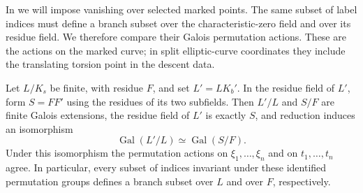 In  we will impose vanishing over selected marked
points. The same subset of label indices must define a branch subset over
the characteristic-zero field and over its residue field. We therefore
compare their Galois permutation actions. These are the actions on the
marked curve; in split elliptic-curve coordinates they include the
translating torsion point in the descent data.

\begin{lemma}\label{lem:residue-permutations}
Let $L/K_s$ be finite, with residue $F$, and set
$L'=LK_b'$.  In the residue field of $L'$, form $S=FF'$ using the
residues of its two subfields.  Then $L'/L$ and $S/F$ are finite Galois
extensions, the residue field of $L'$ is exactly $S$, and reduction
induces an isomorphism
\[
             \operatorname{Gal}(L'/L)\simeq\operatorname{Gal}(S/F).
\]
Under this isomorphism the permutation actions on $\xi_1,\ldots,\xi_n$
and on $t_1,\ldots,t_n$ agree. In particular, every subset of indices
invariant under these identified permutation groups defines a branch
subset over $L$ and over $F$, respectively.
\end{lemma}

